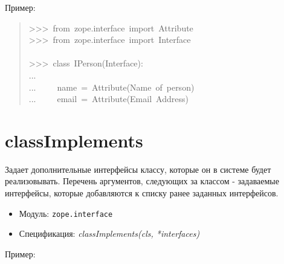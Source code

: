\documentclass[a4paper,openany,twoside,final]{book}
\providecommand*{\DUroletitlereference}[1]{\textsl{#1}}
\begin{document}
Пример:

\begin{quote}{\ttfamily \raggedright \noindent
>{}>{}>~from~zope.interface~import~Attribute\\
>{}>{}>~from~zope.interface~import~Interface\\
~\\
>{}>{}>~class~IPerson(Interface):\\
...\\
...~~~~~name~=~Attribute(\textquotedbl{}Name~of~person\textquotedbl{})\\
...~~~~~email~=~Attribute(\textquotedbl{}Email~Address\textquotedbl{})
}
\end{quote}


\section*{classImplements%
  \label{classimplements}%
}

Задает дополнительные интерфейсы классу, которые он в системе будет
реализовывать.  Перечень аргументов, следующих за классом -
задаваемые интерфейсы, которые добавляются к списку ранее
заданных интерфейсов.

\begin{itemize}

\item Модуль: \texttt{zope.interface}

\item Спецификация: \DUroletitlereference{classImplements(cls, *interfaces)}

\end{itemize}

Пример:
\end{document}
